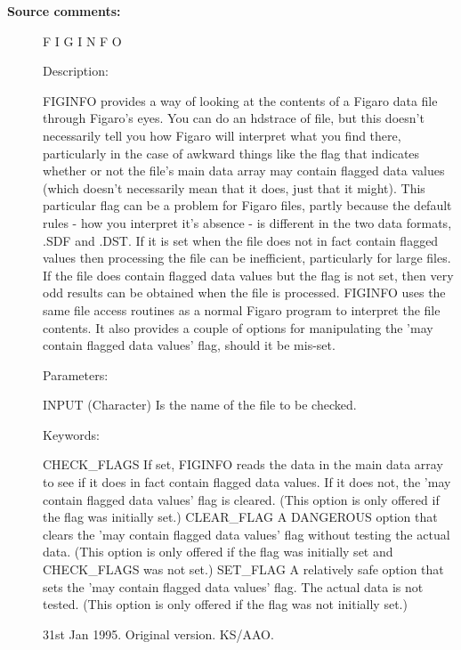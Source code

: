\begin{description}
\begin{description}
\item [\textbf{Source comments:}]
\begin{terminalv}
 F I G I N F O

 Description:

    FIGINFO provides a way of looking at the contents of a Figaro data
    file through Figaro's eyes. You can do an hdstrace of file, but this
    doesn't necessarily tell you how Figaro will interpret what you
    find there, particularly in the case of awkward things like the
    flag that indicates whether or not the file's main data array may
    contain flagged data values (which doesn't necessarily mean that it
    does, just that it might). This particular flag can be a problem for
    Figaro files, partly because the default rules - how you interpret
    it's absence - is different in the two data formats, .SDF and .DST.
    If it is set when the file does not in fact contain flagged values then
    processing the file can be inefficient, particularly for large files. If
    the file does contain flagged data values but the flag is not set, then
    very odd results can be obtained when the file is processed. FIGINFO
    uses the same file access routines as a normal Figaro program to
    interpret the file contents. It also provides a couple of options for
    manipulating the 'may contain flagged data values' flag, should it
    be mis-set.

 Parameters:

    INPUT     (Character) Is the name of the file to be checked.

 Keywords:

    CHECK_FLAGS   If set, FIGINFO reads the data in the main data array
                  to see if it does in fact contain flagged data values.
                  If it does not, the 'may contain flagged data values'
                  flag is cleared. (This option is only offered if the
                  flag was initially set.)
    CLEAR_FLAG    A DANGEROUS option that clears the 'may contain flagged
                  data values' flag without testing the actual data. (This
                  option is only offered if the flag was initially set and
                  CHECK_FLAGS was not set.)
    SET_FLAG      A relatively safe option that sets the 'may contain
                  flagged data values' flag. The actual data is not tested.
                  (This option is only offered if the flag was not initially
                  set.)

    31st Jan 1995.  Original version. KS/AAO.
\end{terminalv}
\end{description}

\end{description}
